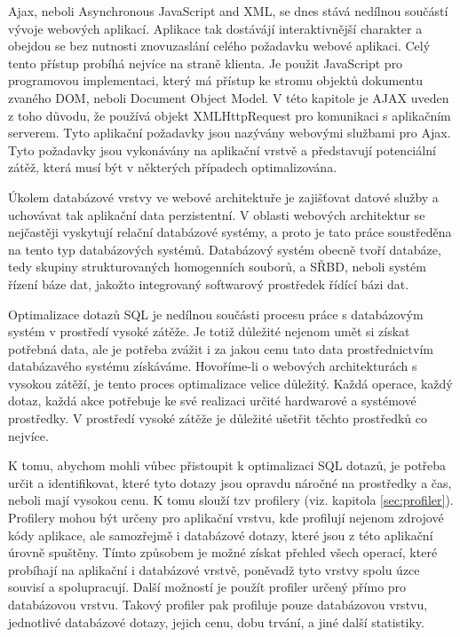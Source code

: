 \documentclass[12pt]{article}
\begin{document}
Ajax, neboli Asynchronous JavaScript and XML, se dnes stává nedílnou součástí vývoje webových aplikací. Aplikace tak dostávájí interaktivnější charakter a obejdou se bez nutnosti znovuzaslání celého požadavku webové aplikaci. Celý tento přístup probíhá nejvíce na straně klienta. Je použit JavaScript pro programovou implementaci, který má přístup ke stromu objektů dokumentu zvaného DOM, neboli Document Object Model. V této kapitole je AJAX uveden z toho důvodu, že používá objekt XMLHttpRequest pro komunikaci s aplikačním serverem. Tyto aplikační požadavky jsou nazývány webovými službami pro Ajax. Tyto požadavky jsou vykonávány na aplikační vrstvě a představují potenciální zátěž, která musí být v některých případech optimalizována.\cite{ajax}



\label{sec:database}
Úkolem databázové vrstvy ve webové architektuře je zajišťovat datové služby a uchovávat tak aplikační data perzistentní. V oblasti webových architektur se nejčastěji vyskytují relační databázové systémy, a proto je tato práce soustředěna na tento typ databázových systémů. Databázový systém obecně tvoří databáze, tedy skupiny strukturovaných homogenních souborů, a SŘBD, neboli systém řízení báze dat, jakožto integrovaný softwarový prostředek řídící bázi dat.

Optimalizace dotazů SQL je nedílnou součásti procesu práce s databázovým systém v prostředí vysoké zátěže. Je totiž důležité nejenom umět si získat potřebná data, ale je potřeba zvážit i za jakou cenu tato data prostřednictvím databázavého systému získáváme. Hovoříme-li o webových architekturách s vysokou zátěží, je tento proces optimalizace velice důležitý. Každá operace, každý dotaz, každá akce potřebuje ke své realizaci určité hardwarové a systémové prostředky. V prostředí vysoké zátěže je důležité ušetřit těchto prostředků co nejvíce.

K tomu, abychom mohli vůbec přistoupit k optimalizaci SQL dotazů, je potřeba určit a identifikovat, které tyto dotazy jsou opravdu náročné na prostředky a čas, neboli mají vysokou cenu. K tomu slouží tzv profilery (viz. kapitola \ref{sec:profiler}). Profilery mohou být určeny pro aplikační vrstvu, kde profilují nejenom zdrojové kódy aplikace, ale samozřejmě i databázové dotazy, které jsou z této aplikační úrovně spuštěny. Tímto způsobem je možné získat přehled všech operací, které probíhají na aplikační i databázové vrstvě, poněvadž tyto vrstvy spolu úzce souvisí a spolupracují. Další možností je použít profiler určený přímo pro databázovou vrstvu. Takový profiler pak profiluje pouze databázovou vrstvu, jednotlivé databázové dotazy, jejich cenu, dobu trvání, a jiné další statistiky.
\end{document}

